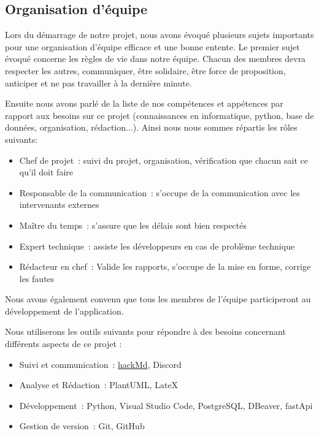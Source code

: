 \documentclass[11pt]{article}
\begin{document}
\subsection{Organisation d'équipe}

Lors du démarrage de notre projet, nous avons évoqué plusieurs sujets importants pour une organisation d'équipe efficace et une bonne entente. Le premier sujet évoqué concerne les règles de vie dans notre équipe. Chacun des membres devra respecter les autres, communiquer, être solidaire, être force de proposition, anticiper et ne pas travailler à la dernière minute.


\bigbreak

Ensuite nous avons parlé de la liste de nos compétences et appétences par rapport aux besoins sur ce projet (connaissances en informatique, python, base de données, organisation, rédaction...). Ainsi nous nous sommes répartis les rôles suivants:
\begin{itemize}
    \item{Chef de projet~: suivi du projet, organisation, vérification que chacun sait ce qu’il doit faire}
    \item{Responsable de la communication~: s'occupe de la communication avec les intervenants externes}
    \item{Maître du temps~: s’assure que les délais sont bien respectés}
    \item{Expert technique~: assiste les développeurs en cas de problème technique}
    \item{Rédacteur en chef~: Valide les rapports, s'occupe de la mise en forme, corrige les fautes}
\end{itemize}

Nous avons également convenu que tous les membres de l'équipe participeront au développement de l'application.

\bigbreak

Nous utiliserons les outils suivants pour répondre à des besoins concernant différents aspects de ce projet :
\begin{itemize}
    \item{Suivi et communication~: \href{https://hackmd.io/CMTCDVW6Spe2PHXOhdKTRQ}{hackMd}, Discord}
    \item{Analyse et Rédaction~: PlantUML, LateX}
    \item{Développement~: Python, Visual Studio Code, PostgreSQL, DBeaver, fastApi}
    \item{Gestion de version~: Git, GitHub}
\end{itemize}
\end{document}
